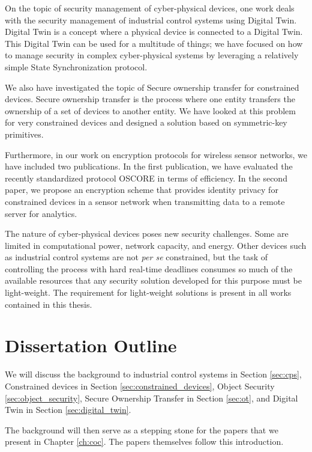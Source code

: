 On the topic of security management of cyber-physical devices, one work deals with the security management of industrial control systems using Digital Twin. Digital Twin is a concept where a physical device is connected to a Digital Twin. This Digital Twin can be used for a multitude of things; we have focused on how to manage security in complex cyber-physical systems by leveraging a relatively simple State Synchronization protocol.

We also have investigated the topic of Secure ownership transfer for constrained devices. Secure ownership transfer is the process where one entity transfers the ownership of a set of devices to another entity. We have looked at this problem for very constrained devices and designed a solution based on symmetric-key primitives.

Furthermore, in our work on encryption protocols for wireless sensor networks, we have included two publications. In the first publication, we have evaluated the recently standardized protocol OSCORE in terms of efficiency.
In the second paper, we propose an encryption scheme that provides identity privacy for constrained devices in a sensor network when transmitting data to a remote server for analytics.

The nature of cyber-physical devices poses new security challenges. Some are limited in computational power, network capacity, and energy. Other devices such as industrial control systems are not \emph{per se} constrained, but the task of controlling the process with hard real-time deadlines consumes so much of the available resources that any security solution developed for this purpose must be light-weight. The requirement for light-weight solutions is present in all works contained in this thesis.

\section{Dissertation Outline}

 We will discuss the background to industrial control systems in Section \ref{sec:cps}, Constrained devices in Section \ref{sec:constrained_devices}, Object Security \ref{sec:object_security}, Secure Ownership Transfer in Section \ref{sec:ot}, and Digital Twin in Section \ref{sec:digital_twin}. 

The background will then serve as a stepping stone for the papers that we present in Chapter \ref{ch:coc}. The papers themselves follow this introduction.


